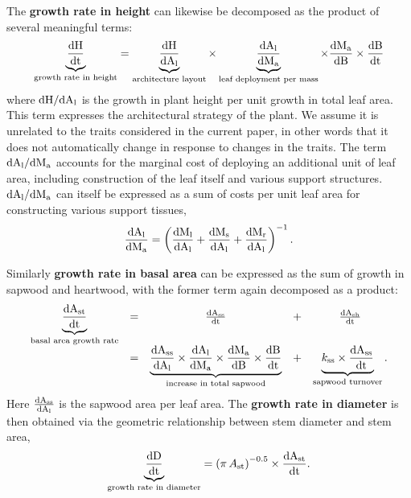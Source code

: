 \documentclass[a4paper,11pt]{article}
\begin{document}
The \textbf{growth rate in height} can likewise be decomposed as the product of several meaningful terms:
\begin{equation}\label{eq:eq2}
\underbrace{\frac{\rm{d} H}{\rm{d} t}}_{\text{growth rate in height}} = \underbrace{\frac{\rm{d} H}{\rm{d} A_{\rm l}}}_{\text{architecture layout}} \times \underbrace{{\frac{\rm{d} A_{\rm l}}{\rm{d} M_{\rm a} }}}_{\text{leaf deployment per mass}} \times {\frac{\ensuremath{\rm{d}}M_{\rm a} }{\ensuremath{\rm{d}}B}} \times {\frac{\ensuremath{\rm{d}}B}{\ensuremath{\rm{d}}t}}
\end{equation}
where $\rm{d} H / \rm{d} A_{\rm l}$ is the growth in plant height
per unit growth in total leaf area. This term expresses the architectural
strategy of the plant. We assume it is unrelated to the traits considered in the current paper, in other words that it does not automatically change in response to changes in the traits. The term $\rm{d} A_{\rm l} / \rm{d} M_{\rm a} $
accounts for the marginal cost of deploying an additional unit of leaf
area, including construction of the leaf itself and various support
structures.  $\rm{d} A_{\rm l} / \rm{d} M_{\rm a} $
can itself be expressed as a sum of costs per unit leaf
area for constructing various support tissues,
\begin{equation}\label{eq:daldmt}
\frac{\rm{d} A_{\rm l}}{\rm{d} M_{\rm a} }
= \left(\frac{\rm{d} M_{\rm l}}{\rm{d} A_{\rm l}}
 +  \frac{\rm{d} M_{\rm s}}{\rm{d} A_{\rm l}} + \frac{\rm{d} M_{\rm r}}{\rm{d} A_{\rm l}}\right)^{-1}.
\end{equation}

Similarly \textbf{growth rate in basal area} can be expressed as the sum of growth in sapwood and heartwood, with the former term again decomposed as a product:
\begin{equation}\label{eq:eq3}
\begin{array}{ccccc}
\underbrace{{\frac{\rm{d} A_{\rm st}}{\rm{d} t}}}_{\text{basal area growth rate}} &=& \frac{\rm{d} A_{\rm ss}}{\rm{d} t} &+& \frac{\rm{d} A_{\rm sh}}{\rm{d} t} \\
&=& \underbrace{\frac{\rm{d} A_{\rm ss}}{\rm{d} A_{\rm l}}  \times {\frac{\ensuremath{\rm{d}}A_{\rm l}}{\ensuremath{\rm{d}}M_{\rm a} }} \times  {\frac{\ensuremath{\rm{d}}M_{\rm a} }{\ensuremath{\rm{d}}B}} \times {\frac{\ensuremath{\rm{d}}B}{\ensuremath{\rm{d}}t}}}_{\text{increase in total sapwood}} &+&  \underbrace{k_{\rm ss} \times \frac{\rm{d} A_{\rm ss}}{\rm{d} t}}_{\text{sapwood turnover}}.\\
\end{array}
\end{equation}
Here $\frac{\rm{d} A_{\rm ss}}{\rm{d} A_{\rm l}} $ is the  sapwood area per leaf area. The \textbf{growth rate in diameter} is then obtained via the geometric relationship between stem diameter and stem area,
\begin{equation}\label{eq:eq4}
\underbrace{\frac{\rm{d} D}{\rm{d} t}}_{\text{growth rate in diameter}} = \left(\pi \, A_{\rm st}\right)^{-0.5} \times {\frac{\ensuremath{\rm{d}}A_{\rm st}}{\ensuremath{\rm{d}}t}}.
\end{equation}
\end{document}
